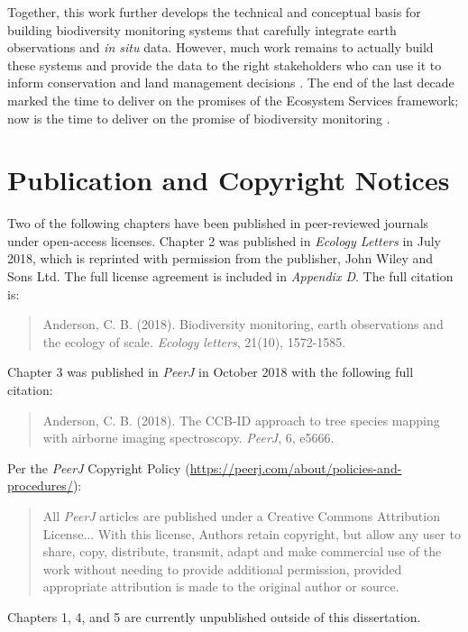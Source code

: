 Together, this work further develops the technical and conceptual basis for building biodiversity monitoring systems that carefully integrate earth observations and \textit{in situ} data. However, much work remains to actually build these systems and provide the data to the right stakeholders who can use it to inform conservation and land management decisions \cite{Guerry2015-zt, Ramirez-Reyes2019-nq}. The end of the last decade marked the time to deliver on the promises of the Ecosystem Services framework; now is the time to deliver on the promise of biodiversity monitoring \cite{Daily2009-jz, IPBES2019-hl}.

\clearpage

\section{Publication and Copyright Notices}

Two of the following chapters have been published in peer-reviewed journals under open-access licenses. Chapter 2 was published in \textit{Ecology Letters} in July 2018, which is reprinted with permission from the publisher, John Wiley and Sons Ltd. The full license agreement is included in \textit{Appendix D}. The full citation is:

\begin{quote}
    Anderson, C. B. (2018). Biodiversity monitoring, earth observations and the ecology of scale. \textit{Ecology letters}, 21(10), 1572-1585.
\end{quote}

\noindent Chapter 3 was published in \textit{PeerJ} in October 2018 with the following full citation:

\begin{quote}
    Anderson, C. B. (2018). The CCB-ID approach to tree species mapping with airborne imaging spectroscopy. \textit{PeerJ}, 6, e5666.
\end{quote}

\noindent Per the \textit{PeerJ} Copyright Policy (\url{https://peerj.com/about/policies-and-procedures/}):

\begin{quote}
    All \textit{PeerJ} articles are published under a Creative Commons Attribution License... With this license, Authors retain copyright, but allow any user to share, copy, distribute, transmit, adapt and make commercial use of the work without needing to provide additional permission, provided appropriate attribution is made to the original author or source.
\end{quote}

\noindent Chapters 1, 4, and 5 are currently unpublished outside of this dissertation.